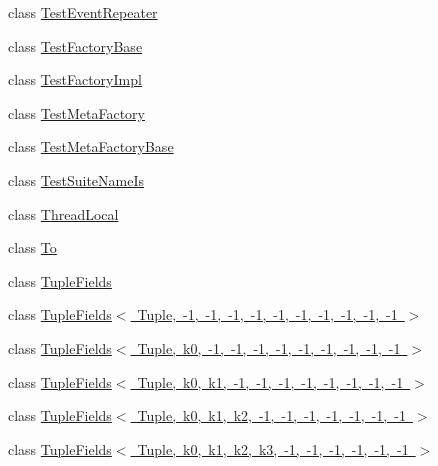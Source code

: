\begin{DoxyCompactItemize}
\item 
class \mbox{\hyperlink{classtesting_1_1internal_1_1_test_event_repeater}{Test\+Event\+Repeater}}
\item 
class \mbox{\hyperlink{classtesting_1_1internal_1_1_test_factory_base}{Test\+Factory\+Base}}
\item 
class \mbox{\hyperlink{classtesting_1_1internal_1_1_test_factory_impl}{Test\+Factory\+Impl}}
\item 
class \mbox{\hyperlink{classtesting_1_1internal_1_1_test_meta_factory}{Test\+Meta\+Factory}}
\item 
class \mbox{\hyperlink{classtesting_1_1internal_1_1_test_meta_factory_base}{Test\+Meta\+Factory\+Base}}
\item 
class \mbox{\hyperlink{classtesting_1_1internal_1_1_test_suite_name_is}{Test\+Suite\+Name\+Is}}
\item 
class \mbox{\hyperlink{classtesting_1_1internal_1_1_thread_local}{Thread\+Local}}
\item 
class \mbox{\hyperlink{classtesting_1_1internal_1_1_to}{To}}
\item 
class \mbox{\hyperlink{classtesting_1_1internal_1_1_tuple_fields}{Tuple\+Fields}}
\item 
class \mbox{\hyperlink{classtesting_1_1internal_1_1_tuple_fields_3_01_tuple_00_01-1_00_01-1_00_01-1_00_01-1_00_01-1_00_c541d4fe72f9dece2f1a50ee33bb16df}{Tuple\+Fields$<$ Tuple, -\/1, -\/1, -\/1, -\/1, -\/1, -\/1, -\/1, -\/1, -\/1, -\/1 $>$}}
\item 
class \mbox{\hyperlink{classtesting_1_1internal_1_1_tuple_fields_3_01_tuple_00_01k0_00_01-1_00_01-1_00_01-1_00_01-1_00_079b3e59a7bb10f5d0d7a5843be2be9d}{Tuple\+Fields$<$ Tuple, k0, -\/1, -\/1, -\/1, -\/1, -\/1, -\/1, -\/1, -\/1, -\/1 $>$}}
\item 
class \mbox{\hyperlink{classtesting_1_1internal_1_1_tuple_fields_3_01_tuple_00_01k0_00_01k1_00_01-1_00_01-1_00_01-1_00_bfbbbfc9cc03949b0b1ff3620709d8ff}{Tuple\+Fields$<$ Tuple, k0, k1, -\/1, -\/1, -\/1, -\/1, -\/1, -\/1, -\/1, -\/1 $>$}}
\item 
class \mbox{\hyperlink{classtesting_1_1internal_1_1_tuple_fields_3_01_tuple_00_01k0_00_01k1_00_01k2_00_01-1_00_01-1_00_897bcaf4b51057696318fe39b8a2dc88}{Tuple\+Fields$<$ Tuple, k0, k1, k2, -\/1, -\/1, -\/1, -\/1, -\/1, -\/1, -\/1 $>$}}
\item 
class \mbox{\hyperlink{classtesting_1_1internal_1_1_tuple_fields_3_01_tuple_00_01k0_00_01k1_00_01k2_00_01k3_00_01-1_00_d404aa1c50b4758daf5bb2f78d0fb44c}{Tuple\+Fields$<$ Tuple, k0, k1, k2, k3, -\/1, -\/1, -\/1, -\/1, -\/1, -\/1 $>$}}

\end{DoxyCompactItemize}
